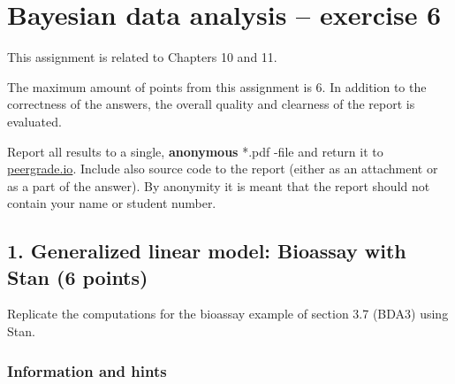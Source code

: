 \documentclass[a4paper,11pt]{article}
\begin{document}
\thispagestyle{empty}

\section*{Bayesian data analysis -- exercise 6}

This assignment is related to Chapters 10 and 11.

The maximum amount of points from this assignment is 6. In addition to the correctness of the answers, the overall quality and clearness of the report is evaluated.

Report all results to a single, {\bf anonymous} *.pdf -file and return it to \href{peergrade.io}{peergrade.io}. Include also source code to the report (either as an attachment or as a part of the answer). By anonymity it is meant that the report should not contain your name or student number.

\vspace{1cm}




\subsection*{1. Generalized linear model: Bioassay with Stan (6 points)}
Replicate the computations for the bioassay example of section 3.7 (BDA3) using Stan.

\subsubsection*{Information and hints}
\end{document}

